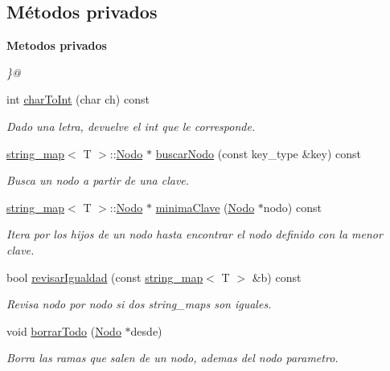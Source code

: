 \subsection*{Métodos privados}
\begin{Indent}{\bf Metodos privados}\par
{\em \}@ }\begin{DoxyCompactItemize}
\item 
int \hyperlink{classstring__map_a8e12bfe4444321c6147f3b7b20c68c05}{char\+To\+Int} (char ch) const 
\begin{DoxyCompactList}\small\item\em Dado una letra, devuelve el int que le corresponde. \end{DoxyCompactList}\item 
\hyperlink{classstring__map}{string\+\_\+map}$<$ T $>$\+::\hyperlink{structstring__map_1_1Nodo}{Nodo} $\ast$ \hyperlink{classstring__map_af0d19588b3448ed088725fb3163fc00b}{buscar\+Nodo} (const key\+\_\+type \&key) const 
\begin{DoxyCompactList}\small\item\em Busca un nodo a partir de una clave. \end{DoxyCompactList}\item 
\hyperlink{classstring__map}{string\+\_\+map}$<$ T $>$\+::\hyperlink{structstring__map_1_1Nodo}{Nodo} $\ast$ \hyperlink{classstring__map_aca26db2736ab8426cea28b96b6079994}{minima\+Clave} (\hyperlink{structstring__map_1_1Nodo}{Nodo} $\ast$nodo) const 
\begin{DoxyCompactList}\small\item\em Itera por los hijos de un nodo hasta encontrar el nodo definido con la menor clave. \end{DoxyCompactList}\item 
bool \hyperlink{classstring__map_a425afd1135cdb0109c5b44f5d0161479}{revisar\+Igualdad} (const \hyperlink{classstring__map}{string\+\_\+map}$<$ T $>$ \&b) const 
\begin{DoxyCompactList}\small\item\em Revisa nodo por nodo si dos string\+\_\+maps son iguales. \end{DoxyCompactList}\item 
void \hyperlink{classstring__map_aec7806190feff7f4ff14679c92ae8cea}{borrar\+Todo} (\hyperlink{structstring__map_1_1Nodo}{Nodo} $\ast$desde)
\begin{DoxyCompactList}\small\item\em Borra las ramas que salen de un nodo, ademas del nodo parametro. \end{DoxyCompactList}\item 

\end{DoxyCompactItemize}
\end{Indent}
